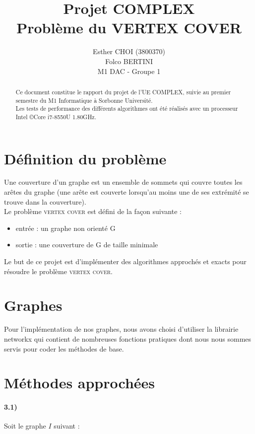 \documentclass[12pt]{article}
\title{Projet COMPLEX\\Problème du VERTEX COVER}
\author{Esther CHOI (3800370)\\Folco BERTINI\\M1 DAC - Groupe 1}
\begin{document}
\maketitle
\tableofcontents

\begin{abstract}
    Ce document constitue le rapport du projet de l'UE COMPLEX, suivie au premier semestre du M1 Informatique à Sorbonne Université. \\
    Les tests de performance des différents algorithmes ont été réalisés avec un processeur Intel \copyright Core \texttrademark i7-8550U 1.80GHz. \\
\end{abstract}

\newpage

\section{Définition du problème}

    Une couverture d'un graphe est un ensemble de sommets qui couvre toutes les arêtes du graphe (une arête est couverte lorsqu'au moins une de ses extrémité se trouve dans la couverture). \\
    Le problème \textsc{vertex cover} est défini de la façon suivante :

    \begin{itemize}
        \item entrée : un graphe non orienté G
        \item sortie : une couverture de G de taille minimale
    \end{itemize}

    Le but de ce projet est d'implémenter des algorithmes approchés et exacts pour résoudre le problème \textsc{vertex cover}.

\section{Graphes}

    Pour l'implémentation de nos graphes, nous avons choisi d'utiliser la librairie networkx qui contient de nombreuses fonctions pratiques dont nous nous sommes servis pour coder les méthodes de base.
    
\section{Méthodes approchées}

    \paragraph{3.1)}
        Soit le graphe $I$ suivant :
\end{document}
